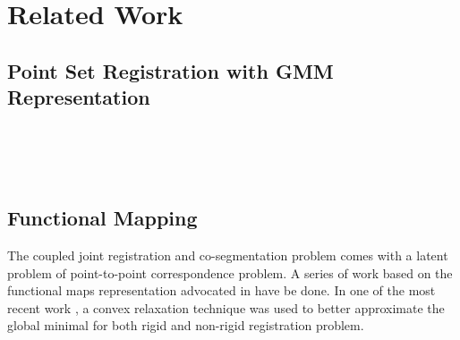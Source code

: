 \section{Related Work}
\label{sec:rw}
\subsection{Point Set Registration with GMM Representation}
\cite{TPS_RPM}\\
\cite{CPD}\\
\cite{GMM_PAMI}\\
\cite{Evangelidis2014}
\subsection{Functional Mapping}
The coupled joint registration and co-segmentation problem comes with a latent problem of point-to-point correspondence problem. A series of work based on the functional maps representation advocated in \cite{Ovsjanikov:2012:FMF:2185520.2185526} have be done. In one of the most recent work \cite{Maron:2016:ConvRelax}, a convex relaxation technique was used to better approximate the global minimal for both rigid and non-rigid registration problem.   